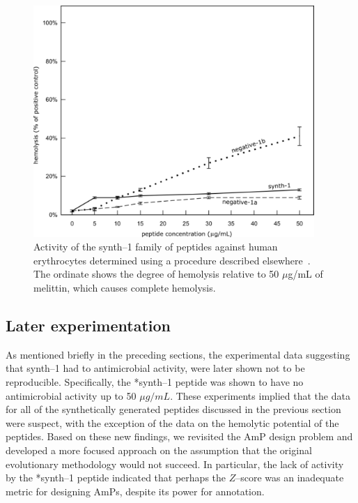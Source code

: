         \begin{figure}
        \centering
        \includegraphics[width=0.95\textwidth]{Body/Images-chap2/hemolysis.pdf}
        \caption[Antimicrobial peptide hemolysis]{Activity
        of the synth--1 family of peptides against human
        erythrocytes determined using a procedure described
        elsewhere~\cite{liu2001denovo}.  The ordinate shows the
        degree of hemolysis relative to 50 $\mu$g/mL of melittin,
        which causes complete hemolysis.} \label{fig:hemolysis}
    \end{figure}





\subsection{Later experimentation}\label{section:fake}


    As mentioned briefly in the preceding sections, the experimental
    data suggesting that synth--1 had to antimicrobial activity,
    were later shown not to be reproducible.  Specifically, the
    *synth--1 peptide was shown to have no antimicrobial activity up
    to 50 $\mu g/mL$.  These experiments implied that the data for
    all of the synthetically generated peptides discussed in the
    previous section were suspect, with the exception of the data on
    the hemolytic potential of the peptides.  Based on these new
    findings, we revisited the AmP design problem and developed a
    more focused approach on the assumption that the original
    evolutionary methodology would not succeed.  In particular, the
    lack of activity by the *synth--1 peptide indicated that perhaps
    the $Z$--score was an inadequate metric for designing AmPs,
    despite its power for annotation.


